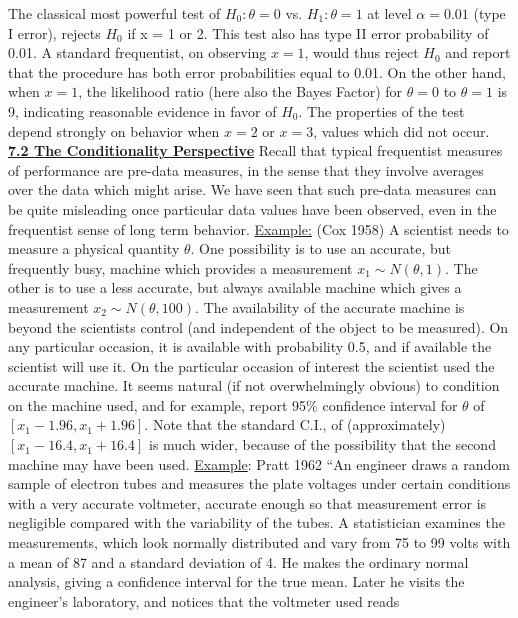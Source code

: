 The classical most powerful test of $H_0:\theta = 0$
vs. $H_1:\theta=1$ at level $\alpha=0.01$ (type I error), rejects
$H_0$ if x = 1 or 2.  This test also has type II error probability of
0.01.
\vskip 4mm
A standard frequentist, on observing $x=1$, would thus reject $H_0$ and
report that the procedure has both error probabilities equal to 0.01.
\vskip 4mm
On the other hand, when $x=1$, the likelihood ratio (here also the Bayes
Factor) for $\theta=0$ to $\theta=1$ is 9, indicating reasonable
evidence in favor of $H_0$.  The properties of the test depend
strongly on behavior when $x=2$ or $x=3$, values which did not
occur.
\vskip 8mm
\ni\underline{\bf 7.2 The Conditionality Perspective}
\vskip 4mm
Recall that typical frequentist measures of performance are pre-data
measures, in the sense that they involve averages over the data which
might arise.  We have seen that such pre-data measures can be
quite misleading once particular data values have been observed, even
in the frequentist sense of long term behavior.
\vskip 4mm
\ni\underline{Example:} (Cox 1958) A scientist needs to measure a
physical quantity $\theta$.  One possibility is to use an accurate,
but frequently busy, machine which provides a measurement 
$x_1\sim N(\theta,1)$.  The other is to use a less accurate, but
always available machine which gives a measurement $x_2\sim
N(\theta,100)$.  The availability of the accurate machine is beyond
the scientists control (and independent of the object to be
measured).  On any particular occasion, it is available with
probability 0.5, and if available the scientist will use it.
\vskip 4mm
On the particular occasion of interest the scientist used the accurate
machine.  It seems natural (if not overwhelmingly obvious) to
condition on the machine used, and for example, report 95\% confidence
interval for $\theta$ of $[x_1 - 1.96, x_1 + 1.96]$.
\vskip 4mm
Note that the standard C.I., of (approximately) $[x_1 - 16.4, x_1 + 16.4]$
 is
much wider, because of the possibility that the second machine may
have been used.
\vskip 4mm
\ni\underline{Example}: Pratt 1962 ``An engineer draws a random sample of electron
tubes and measures the plate voltages under certain conditions with a very
accurate voltmeter, accurate enough so that measurement error is negligible
compared with the variability of the tubes.  A statistician examines the
measurements, which look normally distributed and vary from 75 to 99 volts
with a mean of 87 and a standard deviation of 4.  He makes the ordinary
normal analysis, giving a confidence interval for the true mean.  Later he
visits the engineer's laboratory, and notices that the voltmeter used reads
